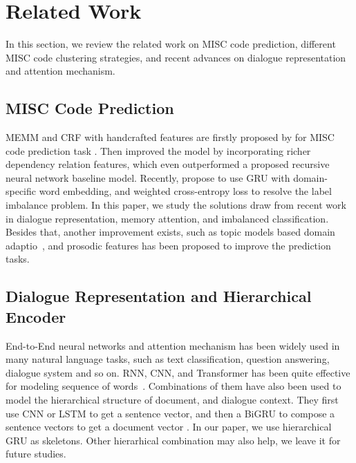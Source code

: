 \section{Related Work}
\label{sec:sentential:related}
In this section, we review the related work on MISC code prediction,
different MISC code clustering strategies, and recent advances on
dialogue representation and attention mechanism.

\subsection{MISC Code Prediction}
\label{ssec:sentential:misc-related}
MEMM and CRF with handcrafted features are firstly proposed by
\citet{can2012case, can2015dialog} for MISC code prediction task
. Then \citet{tanana2015recursive} improved the model by incorporating
richer dependency relation features, which even outperformed a
proposed recursive neural network baseline model. Recently,
\cite{xiao2016behavioral} propose to use GRU with domain-specific word
embedding, and weighted cross-entropy loss to resolve the label
imbalance problem. In this paper, we study the solutions draw from
recent work in dialogue representation, memory attention, and
imbalanced classification. Besides that, another improvement exists,
such as topic models based domain adaptio~\cite{atkins2014scaling,
  huang2018modeling}, and prosodic features \cite{weber2002using} has
been proposed to improve the prediction tasks.



\subsection{Dialogue Representation and Hierarchical Encoder }
\label{ssec:sentential:dialogue-encoder}
End-to-End neural networks and attention mechanism has been widely
used in many natural language tasks, such as text classification,
question answering, dialogue system and so on.  RNN, CNN, and
Transformer has been quite effective for modeling sequence of
words~\cite{ kim14cnn,zhang2015character}. Combinations of them have
also been used to model the hierarchical structure of document, and
dialogue context. They first use CNN or LSTM to get a sentence vector,
and then a BiGRU to compose a sentence vectors to get a document
vector \cite{tang2015document, li2015hierarchical,
  yang2016hierarchical,sordoni2015hierarchical, serban2016building,
  serban2017multiresolution}. In our paper, we use hierarchical GRU as
skeletons. Other hierarhical combination may also help, we leave it
for future studies.

